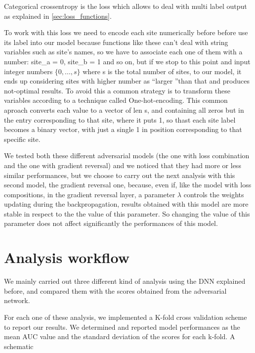 \documentclass[12pt]{report}
\begin{document}
Categorical crossentropy is the loss which allows to deal with multi label output as explained in \ref{sec:loss_functions}.
\begin{notes}
\item To work with this loss we need to encode each site numerically before before use its label into our model because functions like these can't deal with string variables such as site's names, so we have to associate each one of them with a number: site\_a = 0, site\_b = 1 and so on, but if we stop to this point and input integer numbers $\{0, ..., s\}$ where s is the total number of sites, to our model, it ends up considering sites with higher number as \textquotedblleft larger \textquotedblright than that and produces not-optimal results.
To avoid this a common strategy is to transform these variables according to a technique called One-hot-encoding.
This common aproach converts each value to a vector of len s, and containing all zeros but in the entry corresponding to that site, where it puts 1, so thast each site label becomes a binary vector, with just a single 1 in position corresponding to that specific site.
\end{notes}

We tested both these different adversarial models (the one with loss combination and the one with gradient reversal) and we noticed that they had more or less similar performances, but we choose to carry out the next analysis with this second model, the gradient reversal one, because, even if, like the model with loss compositions, in the gradient reversal layer, a parameter $\lambda$ controls the weights updating during the backpropagation,
results obtained with this model are more stable in respect to the the value of this parameter.
So changing the value of this parameter does not affect significantly the performances of this model.

\newpage

\section{Analysis workflow}

We mainly carried out three different kind of analysis using the DNN explained before, and compared them with the scores obtained from the adversarial network.

For each one of these analysis, we implemented a K-fold cross validation scheme to report our results. We determined and reported model performances as the mean AUC value and the standard deviation of the scores for each k-fold. A schematic
\end{document}
